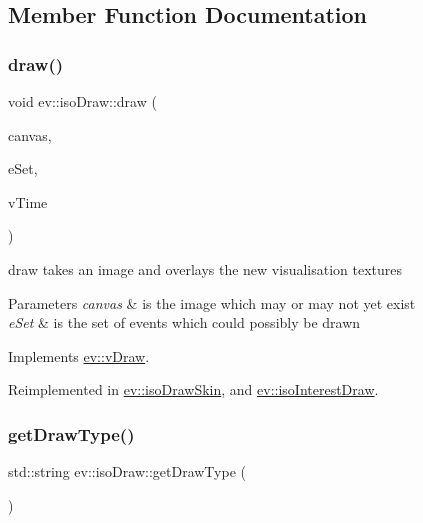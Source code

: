 \subsection{Member Function Documentation}
\mbox{\label{classev_1_1isoDraw_ad481b618ae2d08664481ffc4b3c4dd95}} 
\subsubsection{\texorpdfstring{draw()}{draw()}}
{\footnotesize\ttfamily void ev\+::iso\+Draw\+::draw (\begin{DoxyParamCaption}\item[{cv\+::\+Mat \&}]{canvas,  }\item[{const ev\+::v\+Queue \&}]{e\+Set,  }\item[{int}]{v\+Time }\end{DoxyParamCaption})\hspace{0.3cm}{\ttfamily [virtual]}}



draw takes an image and overlays the new visualisation textures 


\begin{DoxyParams}{Parameters}
{\em canvas} & is the image which may or may not yet exist \\
\hline
{\em e\+Set} & is the set of events which could possibly be drawn \\
\hline
\end{DoxyParams}


Implements \hyperlink{classev_1_1vDraw_af1eee5dcdf3b4cfee6a3024e5cd706f8}{ev\+::v\+Draw}.



Reimplemented in \hyperlink{classev_1_1isoDrawSkin_a2d4ed05b06bea443974f5b07a4d69374}{ev\+::iso\+Draw\+Skin}, and \hyperlink{classev_1_1isoInterestDraw_a3276f946c09d4cd0009f8379ea24d409}{ev\+::iso\+Interest\+Draw}.

\mbox{\label{classev_1_1isoDraw_abd32cc393e5489ee97b5a8b94e6dd88d}} 
\subsubsection{\texorpdfstring{get\+Draw\+Type()}{getDrawType()}}
{\footnotesize\ttfamily std\+::string ev\+::iso\+Draw\+::get\+Draw\+Type (\begin{DoxyParamCaption}{ }\end{DoxyParamCaption})\hspace{0.3cm}{\ttfamily [virtual]}}



